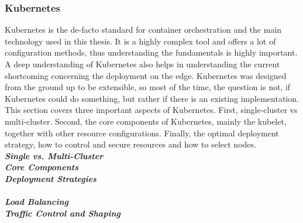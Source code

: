 \subsubsection{Kubernetes} \label{kubernetesStandardization efforts}
Kubernetes is the de-facto standard for container orchestration and the main technology used in this thesis. It is a highly complex tool and offers a lot of configuration methods, thus understanding the fundamentals is highly important. A deep understanding of Kubernetes also helps in understanding the current shortcoming concerning the deployment on the edge. Kubernetes was designed from the ground up to be extensible, so most of the time, the question is not, if Kubernetes could do something, but rather if there is an existing implementation.\\
This section covers three important aspects of Kubernetes. First, single-cluster vs multi-cluster. Second, the core components of Kubernetes, mainly the kubelet, together with other resource configurations. Finally, the optimal deployment strategy, how to control and secure resources and how to select nodes.\\[0.5mm]
\textbf{\textit{Single vs. Multi-Cluster}}\\

\textbf{\textit{Core Components}}\\

\textbf{\textit{Deployment Strategies}}\\

\\[0.5mm]
\textbf{\textit{Load Balancing}}\\

\textbf{\textit{Traffic Control and Shaping}}\\


